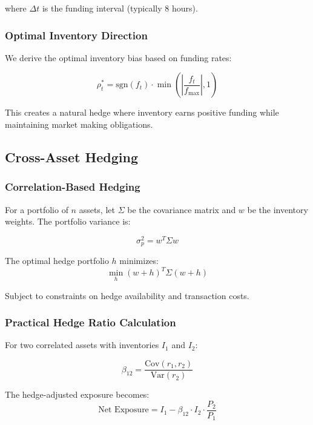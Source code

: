 \documentclass[11pt,a4paper]{article}
\theoremstyle{definition}
\begin{document}
where $\Delta t$ is the funding interval (typically 8 hours).

\subsubsection{Optimal Inventory Direction}

We derive the optimal inventory bias based on funding rates:

\begin{equation}
\rho_t^* = \text{sgn}(f_t) \cdot \min\left(\left|\frac{f_t}{f_{\max}}\right|, 1\right)
\end{equation}

This creates a natural hedge where inventory earns positive funding while maintaining market making obligations.

\subsection{Cross-Asset Hedging}

\subsubsection{Correlation-Based Hedging}

For a portfolio of $n$ assets, let $\Sigma$ be the covariance matrix and $w$ be the inventory weights. The portfolio variance is:

\begin{equation}
\sigma_p^2 = w^T \Sigma w
\end{equation}

The optimal hedge portfolio $h$ minimizes:
\begin{equation}
\min_h \left(w + h\right)^T \Sigma \left(w + h\right)
\end{equation}

Subject to constraints on hedge availability and transaction costs.

\subsubsection{Practical Hedge Ratio Calculation}

For two correlated assets with inventories $I_1$ and $I_2$:

\begin{equation}
\beta_{12} = \frac{\text{Cov}(r_1, r_2)}{\text{Var}(r_2)}
\end{equation}

The hedge-adjusted exposure becomes:
\begin{equation}
\text{Net Exposure} = I_1 - \beta_{12} \cdot I_2 \cdot \frac{P_2}{P_1}
\end{equation}
\end{document}
